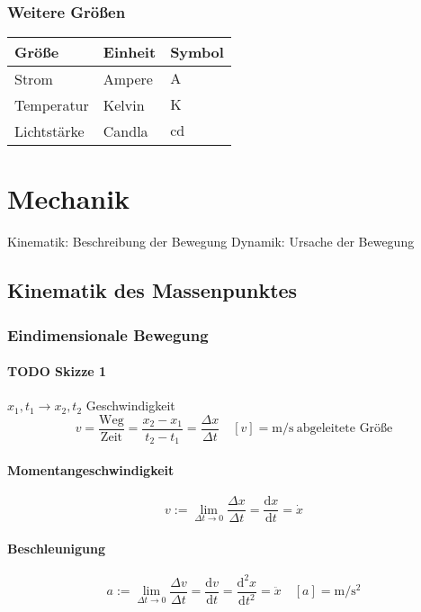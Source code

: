 \documentclass[a4paper]{scrartcl}
\begin{document}
\subsubsection{Weitere Größen}
\label{sec-6-2-2}
\begin{center}
\begin{tabular}{lll}
Größe & Einheit & Symbol\\
\hline
Strom & Ampere & $\si{\ampere}$\\
Temperatur & Kelvin & $\si{\kelvin}$\\
Lichtstärke & Candla & $\si{\candela}$\\
\end{tabular}
\end{center}

\section{Mechanik}
\label{sec-7}
Kinematik: Beschreibung der Bewegung
Dynamik: Ursache der Bewegung

\subsection{Kinematik des Massenpunktes}
\label{sec-7-1}
\subsubsection{Eindimensionale Bewegung}
\label{sec-7-1-1}
\paragraph{{\bfseries\sffamily TODO} Skizze 1}
\label{sec-7-1-1-1}
$x_1,t_1 \longrightarrow x_2, t_2$
Geschwindigkeit
\[v = \frac{\text{Weg}}{\text{Zeit}} = \frac{x_2 - x_1}{t_2 - t_1} = \frac{\Delta x}{\Delta t}\quad [v] = \si{\meter\per\second}~\text{abgeleitete Größe}\]
\paragraph{Momentangeschwindigkeit}
\label{sec-7-1-1-2}
\[v := \lim_{\Delta t\to 0} \frac{\Delta{x}}{\Delta t} = \frac{\mathrm{d}x}{\mathrm{d}t} = \dot{x}\]
\paragraph{Beschleunigung}
\label{sec-7-1-1-3}
\[a := \lim_{\Delta t\to 0} \frac{\Delta{v}}{\Delta{t}} = \frac{\mathrm{d}v}{\mathrm{d}t} = \frac{\mathrm{d}^2x}{\mathrm{d}t^2} = \ddot{x}\quad [a]=\si{\meter\per\second\squared}\]
\end{document}
